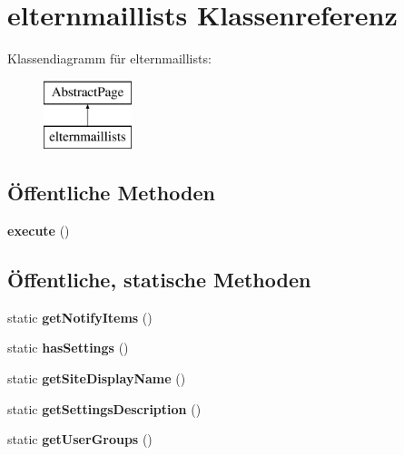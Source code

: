 \hypertarget{classelternmaillists}{}\section{elternmaillists Klassenreferenz}
\label{classelternmaillists}
Klassendiagramm für elternmaillists\+:\begin{figure}[H]
\begin{center}
\leavevmode
\includegraphics[height=2.000000cm]{classelternmaillists}
\end{center}
\end{figure}
\subsection*{Öffentliche Methoden}
\begin{DoxyCompactItemize}
\item 
\mbox{\label{classelternmaillists_a943289c05ffb4891e9e53d95615b469e}} 
{\bfseries execute} ()
\end{DoxyCompactItemize}
\subsection*{Öffentliche, statische Methoden}
\begin{DoxyCompactItemize}
\item 
\mbox{\label{classelternmaillists_affe1936df2c674d61e8ca63770af0c38}} 
static {\bfseries get\+Notify\+Items} ()
\item 
\mbox{\label{classelternmaillists_ace8ad91cddb292cc849f4d9ee9e78eac}} 
static {\bfseries has\+Settings} ()
\item 
\mbox{\label{classelternmaillists_af61562aa01fef33c7bbee959c9bdeb63}} 
static {\bfseries get\+Site\+Display\+Name} ()
\item 
\mbox{\label{classelternmaillists_a222b50ebd5a7db26b346591065e2c39c}} 
static {\bfseries get\+Settings\+Description} ()
\item 
\mbox{\label{classelternmaillists_a31a13c9b3f88237f0f9f8ec678f5214c}} 
static {\bfseries get\+User\+Groups} ()
\end{DoxyCompactItemize}

